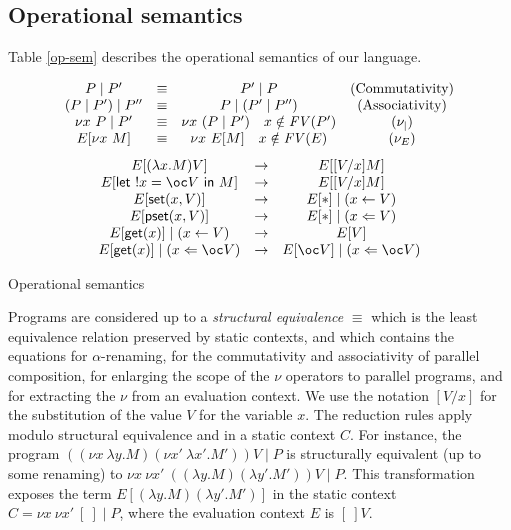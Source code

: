 \documentclass[11pt]{article}
\newcommand{\arrow}{\rightarrow}        \newcommand{\trarrow}{\stackrel{*}{\rightarrow}}        \newcommand{\limp}{\multimap} \newcommand{\bang}{\oc}
\newcommand{\letm}[3]{{\sf let} \ ! #1 = #2 \ {\sf in} \ #3}    \newcommand{\tertype}{{\bf 1}}
\newcommand{\pst}[2]{{\sf pset}(#1,#2)}
\newcommand{\st}[2]{{\sf set}(#1,#2)}
\newcommand{\get}[1]{{\sf get}(#1)}
\newcommand{\new}[2]{\nu #1 \ #2}
\newcommand{\store}[2]{(#1 \leftarrow #2)}
\newcommand{\pstore}[2]{(#1 \Leftarrow #2)}
\begin{document}
\subsection{Operational semantics}
Table \ref{op-sem} describes the operational semantics of our language.
\begin{table}
{\footnotesize
\[
\begin{array}{cccc}

P\mid P' &\equiv &P'\mid P                                &\mbox{(Commutativity)} \\
(P\mid P')\mid P'' &\equiv &P \mid (P' \mid P'')          &\mbox{(Associativity)} \\
\new{x}{P}\mid P' &\equiv &\new{x}{(P\mid P')} \quad x\notin \w{FV}(P')  &\mbox{($\nu_{\mid}$)} \\
E[\new{x}{M}] &\equiv &\new{x}{E[M]} \quad x\notin \w{FV}(E)            &\mbox{($\nu_{E}$)} 
\end{array}
\]
\[
\begin{array}{ccc}
E[(\lambda x.M)V]  &\arrow &E[[V/x]M] \\
E[\letm{x}{\bang V}{M}] &\arrow &E[[V/x]M] \\
E[\st{x}{V}]       &\arrow &E[*]\mid \store{x}{V} \\
E[\pst{x}{V}]      &\arrow &E[*]\mid \pstore{x}{V} \\
E[\get{x}] \mid \store{x}{V} &\arrow &E[V] \\
E[\get{x}] \mid \pstore{x}{\bang V} &\arrow &E[\bang V] \mid \pstore{x}{\bang V}

\end{array}
\]}
\caption{Operational semantics} \label{op-sem}
\end{table}
Programs are considered up to a {\em structural equivalence} $\equiv$ which
is the least equivalence relation preserved by  static contexts,
and which contains the equations for  $\alpha$-renaming, 
for the commutativity and associativity  of parallel composition,
for enlarging the scope of the $\nu$ operators to parallel programs,
and for extracting the $\nu$ from an evaluation context.
We use the notation $[V/x]$ for the substitution of the value $V$
for the variable $x$.
The reduction rules apply modulo structural equivalence 
and in a static context $C$.
For instance, the program 
$((\new{x}{\lambda y.M})(\new{x'}{\lambda x'.M'}))V \mid P$
is structurally equivalent (up to some renaming) to
$\new{x}{\new{x'}{((\lambda y.M)(\lambda y'.M'))V}} \mid P$. This transformation
exposes the term  $E[(\lambda y.M)(\lambda y'.M')]$ in the 
static context $C=\new{x}{\new{x'}{[~]}} \mid P$, where the
evaluation context $E$ is $[~]V$.
\end{document}
